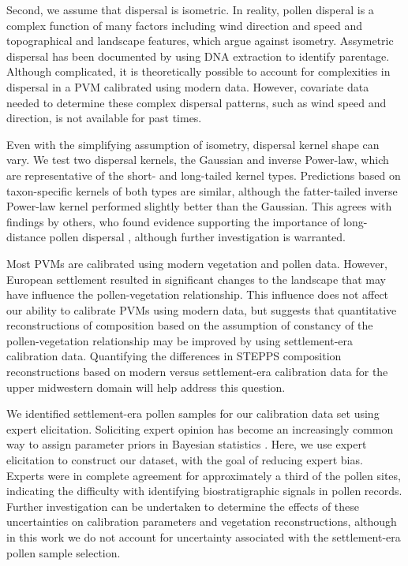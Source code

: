 \documentclass[12pt]{article}
\begin{document}
Second, we assume that dispersal is isometric. In reality, pollen
disperal is a complex function of many factors including wind
direction and speed and topographical and landscape features, which
argue against isometry. Assymetric dispersal has been documented by
\citep{robledo2005patterns} using DNA extraction to identify
parentage. Although complicated, it is theoretically possible to
account for complexities in dispersal in a PVM calibrated using modern
data. However, covariate data needed to determine these complex
dispersal patterns, such as wind speed and direction, is not available
for past times.

Even with the simplifying assumption of isometry, dispersal kernel
shape can vary. We test two dispersal kernels, the Gaussian and
inverse Power-law, which are representative of the short- and
long-tailed kernel types. Predictions based on taxon-specific kernels
of both types are similar, although the fatter-tailed inverse
Power-law kernel performed slightly better than the Gaussian. This
agrees with findings by others, who found evidence supporting the
importance of long-distance pollen dispersal
\citep{austerlitz2004using, macinnis2012measuring}, although further
investigation is warranted.

Most PVMs are calibrated using modern vegetation and pollen
data. However, European settlement resulted in significant changes to
the landscape that may have influence the pollen-vegetation
relationship. This influence does not affect our ability to calibrate
PVMs using modern data, but suggests that quantitative reconstructions
of composition based on the assumption of constancy of the
pollen-vegetation relationship may be improved by using settlement-era
calibration data. Quantifying the differences in STEPPS composition
reconstructions based on modern versus settlement-era calibration data
for the upper midwestern domain will help address this question.

We identified settlement-era pollen samples for our calibration data
set using expert elicitation. Soliciting expert opinion has become an
increasingly common way to assign parameter priors in Bayesian
statistics \citep{choy2009elicitation}. Here, we use expert
elicitation to construct our dataset, with the goal of reducing expert
bias. Experts were in complete agreement for approximately a third of
the pollen sites, indicating the difficulty with identifying
biostratigraphic signals in pollen records. Further investigation can
be undertaken to determine the effects of these uncertainties on
calibration parameters and vegetation reconstructions, although in
this work we do not account for uncertainty associated with the
settlement-era pollen sample selection.
\end{document}
